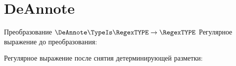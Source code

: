 \section{DeAnnote}
\begin{frame}{Преобразование $\DeAnnote\TypeIs\RegexTYPE\to\RegexTYPE$}
	Регулярное выражение до преобразования:

	Регулярное выражение после снятия детерминирующей разметки:

\end{frame}
